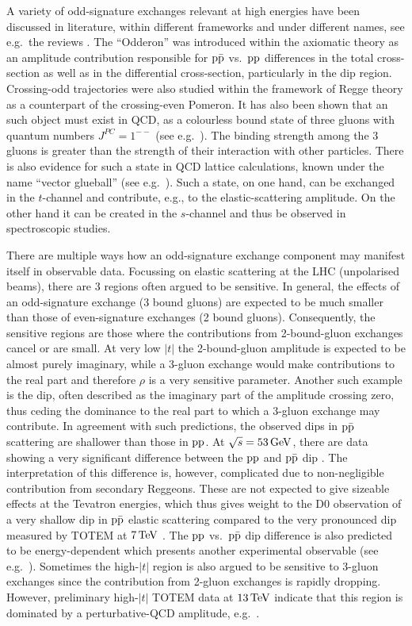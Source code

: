 A variety of odd-signature exchanges relevant at high energies have been discussed in literature, within different frameworks and under different names, see e.g.~the reviews \cite{braun,ewerz}. The ``Odderon'' was introduced within the axiomatic theory \cite{nicolescu-1992,nicolescu-2007} as an amplitude contribution responsible for $\rm p\bar p$ vs.~$\rm pp$ differences in the total cross-section as well as in the differential cross-section, particularly in the dip region. Crossing-odd trajectories were also studied within the framework of Regge theory as a counterpart of the crossing-even Pomeron. It has also been shown that an such object must exist in QCD, as a colourless bound state of three gluons with quantum numbers $J^{PC} = 1^{--}$ (see e.g.~\cite{bartels-2000}). The binding strength among the 3 gluons is greater than the strength of their interaction with other particles. There is also evidence for such a state in QCD lattice calculations, known under the name ``vector glueball'' (see e.g.~\cite{morningstar-1999}). Such a state, on one hand, can be exchanged in the $t$-channel and contribute, e.g., to the elastic-scattering amplitude. On the other hand it can be created in the $s$-channel and thus be observed in spectroscopic studies.

There are multiple ways how an odd-signature exchange component may manifest itself in observable data. Focussing on elastic scattering at the LHC (unpolarised beams), there are 3 regions often argued to be sensitive. In general, the effects of an odd-signature exchange (3 bound gluons) are expected to be much smaller than those of even-signature exchanges (2 bound gluons). Consequently, the sensitive regions are those where the contributions from 2-bound-gluon exchanges cancel or are small. At very low $|t|$ the 2-bound-gluon amplitude is expected to be almost purely imaginary, while a 3-gluon exchange would make contributions to the real part and therefore $\rho$ is a very sensitive parameter. Another such example is the dip, often described as the imaginary part of the amplitude crossing zero, thus ceding the dominance to the real part to which a 3-gluon exchange may contribute. In agreement with such predictions, the observed dips in $\rm p\bar p$ scattering are shallower than those in $\rm pp$. At $\sqrt s = 53\,{\rm GeV}$, there are data showing a very significant difference between the $\rm pp$ and $\rm p\bar p$ dip \cite{breakstone-85}. The interpretation of this difference is, however, complicated due to non-negligible contribution from secondary Reggeons. These are not expected to give sizeable effects at the Tevatron energies, which thus gives weight to the D0 observation of a very shallow dip in $\rm p\bar p$ elastic scattering \cite{d0-elastic} compared to the very pronounced dip measured by TOTEM at $7\,{\rm TeV}$ \cite{totem-7tev-first}. The $\rm pp$ vs.~$\rm p\bar p$ dip difference is also predicted to be energy-dependent which presents another experimental observable (see e.g.~\cite{ster-2015}). Sometimes the high-$|t|$ region is also argued to be sensitive to 3-gluon exchanges since the contribution from 2-gluon exchanges is rapidly dropping. However, preliminary high-$|t|$ TOTEM data at $13\,{\rm TeV}$ indicate that this region is dominated by a perturbative-QCD amplitude, e.g.~\cite{Donnachie:1979yu}.

